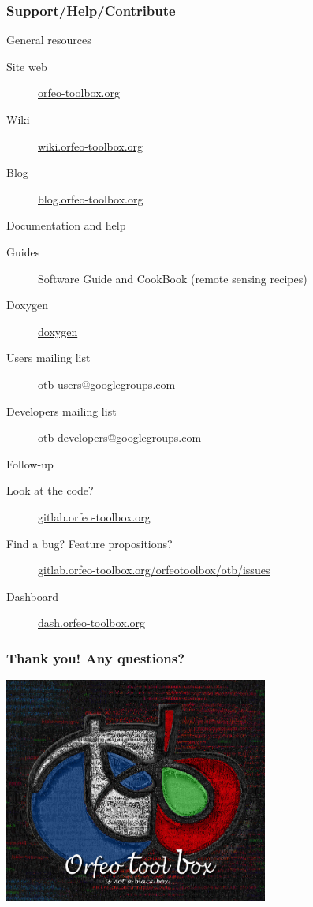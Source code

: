 \documentclass[8pt]{beamer}
\begin{document}
\begin{frame}
\frametitle{Support/Help/Contribute}
\vspace{-0.2cm}
\begin{block}{General resources}
\vspace{-0.2cm}
\begin{description}
\item[Site web] \href{http://www.orfeo-toolbox.org}{orfeo-toolbox.org}
\item[Wiki] \href{http://wiki.orfeo-toolbox.org}{wiki.orfeo-toolbox.org}
\item[Blog] \href{http://blog.orfeo-toolbox.org}{blog.orfeo-toolbox.org}
\end{description}
\end{block}
\vspace{-0.2cm}
\begin{block}{Documentation and help}
\vspace{-0.2cm}
\begin{description}
\item[Guides] Software Guide and CookBook (remote sensing recipes)
\item[Doxygen] \href{http://www.orfeo-toolbox.org/doxygen}{doxygen}
\item[Users mailing list] otb-users@googlegroups.com
\item[Developers mailing list] otb-developers@googlegroups.com
\end{description}
\end{block}
\vspace{-0.2cm}
\begin{block}{Follow-up}
\vspace{-0.2cm}
\begin{description}
\item[Look at the code?] \href{https://gitlab.orfeo-toolbox.org/orfeotoolbox/otb}{gitlab.orfeo-toolbox.org}
\item[Find a bug? Feature propositions?] \href{https://gitlab.orfeo-toolbox.org/orfeotoolbox/otb/issues}{gitlab.orfeo-toolbox.org/orfeotoolbox/otb/issues}
\item[Dashboard] \href{http://dash.orfeo-toolbox.org}{dash.orfeo-toolbox.org}
\end{description}
\end{block}
\end{frame}

\begin{frame}
\frametitle{Thank you! Any questions?}
\begin{minipage}[t][6cm][t]{\textwidth}
\begin{center}
\includegraphics[width=0.65\textwidth]{images/LOGOTB_blackbox.png}
\end{center}
\end{minipage}
\end{frame}
\end{document}
